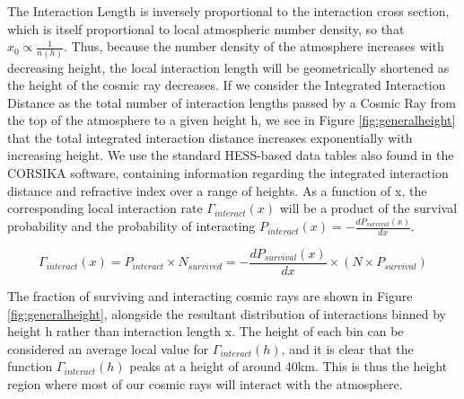 \documentclass{article}
\begin{document}
The Interaction Length is inversely proportional to the interaction cross section, which is itself proportional to local atmospheric number density, so that $x_{0} \propto \frac{1}{n(h)}$. Thus, because the number density of the atmosphere increases with decreasing height, the local interaction length will be geometrically shortened as the height of the cosmic ray decreases. If we consider the Integrated Interaction Distance as the total number of interaction lengths passed by a Cosmic Ray from the top of the atmosphere to a given height h, we see in Figure \ref{fig:generalheight} that the total integrated interaction distance increases exponentially with increasing height. We use the standard HESS-based data tables also found in the CORSIKA software, containing information regarding the integrated interaction distance and refractive index over a range of heights. As a function of x, the corresponding local interaction rate $\Gamma_{interact}(x)$ will be a product of the survival probability and the probability of interacting $P_{interact}(x)= -\frac{dP_{survival}(x)}{dx}$. 

\[ \Gamma_{interact}(x) = P_{interact} \times N_{survived} =  - \frac{dP_{survival}(x)}{dx} \times (N \times  P_{survival}) \]

The fraction of surviving and interacting cosmic rays are shown in Figure \ref{fig:generalheight}, alongside the resultant distribution of interactions binned by height h rather than interaction length x. The height of each bin can be considered an average local value for $\Gamma_{interact}(h)$, and it is clear that the function $\Gamma_{interact}(h)$ peaks at a height of around 40km. This is thus the height region where most of our cosmic rays will interact with the atmosphere.
\end{document}
